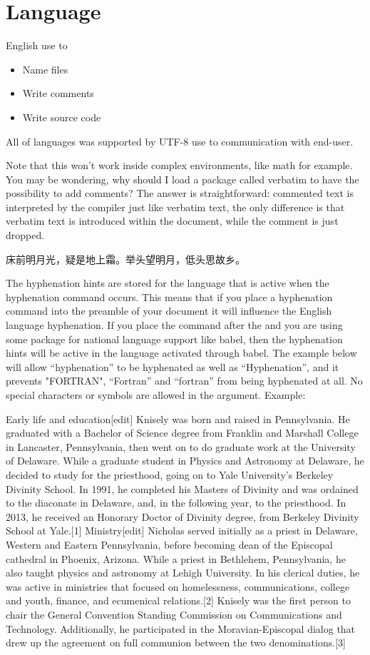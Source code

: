 \chapter{Language}

English use to

\begin{itemize}
\item
Name files
\item
Write comments
\item
Write source code
\end{itemize}

All of languages was supported by UTF-8 use to communication with
\mbox{end-user}.

Note that this won’t work inside complex environments, like math for example.
You may be wondering, why should I load a package called verbatim to have the
possibility to add comments? The answer is straightforward: commented text is
interpreted by the compiler just like verbatim text, the only difference is
that verbatim text is introduced within the document, while the comment is just
dropped.


床前明月光，疑是地上霜。举头望明月，低头思故乡。

The hyphenation hints are stored for the language that is active when the hyphenation
command occurs. This means that if you place a hyphenation command into the preamble of
your document it will influence the English language hyphenation. If you place the command
after the and you are using some package for national language support
like babel, then the hyphenation hints will be active in the language activated through babel.
The example below will allow “hyphenation” to be hyphenated as well as “Hyphenation”,
and it prevents "FORTRAN", “Fortran” and “fortran” from being hyphenated at all. No
special characters or symbols are allowed in the argument. Example:

Early life and education[edit]
Knisely was born and raised in Pennsylvania. He graduated with a Bachelor of Science degree from Franklin and Marshall College in Lancaster, Pennsylvania, then went on to do graduate work at the University of Delaware. While a graduate student in Physics and Astronomy at Delaware, he decided to study for the priesthood, going on to Yale University's Berkeley Divinity School. In 1991, he completed his Masters of Divinity and was ordained to the diaconate in Delaware, and, in the following year, to the priesthood. In 2013, he received an Honorary Doctor of Divinity degree, from Berkeley Divinity School at Yale.[1]
Ministry[edit]
Nicholas served initially as a priest in Delaware, Western and Eastern Pennsylvania, before becoming dean of the Episcopal cathedral in Phoenix, Arizona. While a priest in Bethlehem, Pennsylvania, he also taught physics and astronomy at Lehigh University. In his clerical duties, he was active in ministries that focused on homelessness, communications, college and youth, finance, and ecumenical relations.[2]
Knisely was the first person to chair the General Convention Standing Commission on Communications and Technology. Additionally, he participated in the Moravian-Episcopal dialog that drew up the agreement on full communion between the two denominations.[3]
